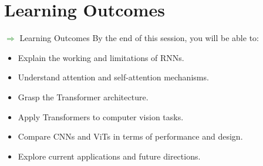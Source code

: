\section{Learning Outcomes}
\begin{frame}[allowframebreaks]{\textcolor{green}{$\Rightarrow$} Learning Outcomes}
    By the end of this session, you will be able to:
    \begin{itemize}
        \item Explain the working and limitations of RNNs.
        \item Understand attention and self-attention mechanisms.
        \item Grasp the Transformer architecture.
        \item Apply Transformers to computer vision tasks.
        \item Compare CNNs and ViTs in terms of performance and design.
        \item Explore current applications and future directions.
    \end{itemize}
\end{frame}